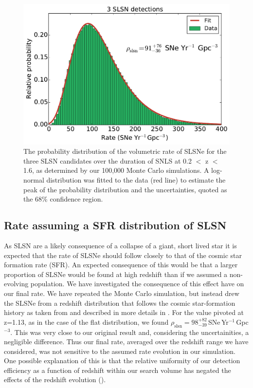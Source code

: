 \begin{figure}
\includegraphics[scale=0.5]{Figures/Chapter3/rateFlat3}
\caption{The probability distribution of the volumetric rate of SLSNe for the three SLSN candidates over the duration of SNLS at 0.2 $<$ z $<$ 1.6, as determined by our 100,000 Monte Carlo simulations. A log-normal distribution was fitted to the data (red line) to estimate the peak of the probability distribution and the uncertainties, quoted as the 68\% confidence region.}
\label{fig:rateFlat3}
\end{figure}

\subsection{Rate assuming a SFR distribution of SLSN}
\label{sec:SFRRate}
As SLSN are a likely consequence of a collapse of a giant, short lived star it is expected that the rate of SLSNe should follow closely to that of the cosmic star formation rate (SFR). An expected consequence of this would be that a larger proportion of SLSNe would be found at high redshift than if we assumed a non-evolving population. We have investigated the consequence of this effect have on our final rate. We have repeated the Monte Carlo simulation, but instead drew the SLSNe from a redshift distribution that follows the cosmic star-formation history as taken from \citet{2006ApJ...651..142H} and described in more details in . For the value pivoted at z=1.13, as in the case of the flat distribution, we found $\rho_{\mathrm{slsn}} = 98^{+82}_{-39}$\,SNe\,Yr$^{-1}$\,Gpc$^{-3}$. This was very close to our original result and, considering the uncertainities, a negligible difference. Thus our final rate, averaged over the redshift range we have considered, was not sensitive to the assumed rate evolution in our simulation. One possible explanation of this is that the relative uniformity of our detection efficiency as a function of redshift within our search volume has negated the effects of the redshift evolution ().
